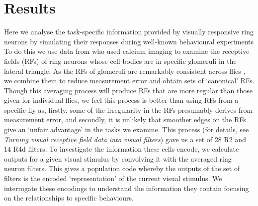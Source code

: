 \documentclass[10pt]{article}
\begin{document}
\section*{Results}
Here we analyse the task-specific information provided by visually responsive ring neurons by simulating their responses during well-known behavioural experiments  To do this we use data from \cite{Seelig2013} who used calcium imaging to examine the receptive fields (RFs) of ring neurons whose cell bodies are in specific glomeruli in the lateral triangle. As the RFs of glomeruli are remarkably consistent across flies \cite{Seelig2013}, we combine them to reduce measurement error and obtain sets of ‘canonical’ RFs. Though this averaging process will produce RFs that are more regular than those given for individual flies, we feel this process is better than using RFs from a specific fly as, firstly, some of the irregularity in the RFs presumably derives from measurement error, and secondly, it is unlikely that smoother edges on the RFs give an ‘unfair advantage’ in the tasks we examine. This process (for details, see \emph{Turning visual receptive field data into visual filters}) gave us a set of 28 R2 and 14 R4d filters. To investigate the information these cells encode, we calculate outputs for a given visual stimulus by convolving it with the averaged ring neuron filters. This gives a population code whereby the outputs of the set of filters is the encoded ‘representation’ of the current visual stimulus. We interrogate these encodings to understand the information they contain focusing on the relationships to specific behaviours.
\end{document}
